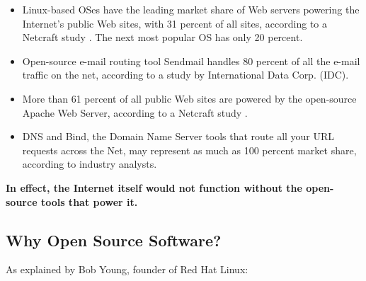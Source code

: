 




\begin{itemize}
\item Linux-based OSes have the leading market share of Web servers
  powering the Internet's public Web sites, with 31 percent of all
  sites, according to a Netcraft study \cite{www:netcraft}.  The next most
  popular OS has only 20 percent.
  
\item Open-source e-mail routing tool Sendmail handles 80 percent of all
  the e-mail traffic on the net, according to a study by International Data Corp. (IDC).
  
\item More than 61 percent of all public Web sites are powered by the
  open-source Apache Web Server, according to a Netcraft study \cite{www:netcraft}.
  
\item DNS and Bind, the Domain Name Server tools that route all your URL
  requests across the Net, may represent as much as 100 percent market
  share, according to industry analysts.

\end{itemize}

{\bf In effect, the Internet itself would not function without the open-source tools that power it.}

\subsection{Why Open Source Software?}
As explained by Bob Young, founder of Red Hat Linux:

